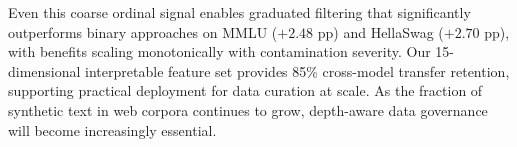 \documentclass[11pt,a4paper]{article}
\begin{document}
Even this coarse ordinal signal enables graduated filtering that significantly outperforms binary approaches on MMLU ($+2.48$ pp) and HellaSwag ($+2.70$ pp), with benefits scaling monotonically with contamination severity.
Our 15-dimensional interpretable feature set provides 85\% cross-model transfer retention, supporting practical deployment for data curation at scale.
As the fraction of synthetic text in web corpora continues to grow, depth-aware data governance will become increasingly essential.


\end{document}
